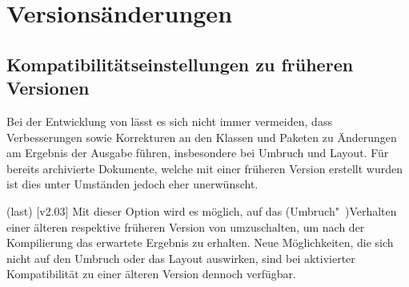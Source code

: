 \chapter{Versionsänderungen}
\begin{Entity}{}
\section{%
  Kompatibilitätseinstellungen zu früheren Versionen%
}
%
Bei der Entwicklung von \TUDScript lässt es sich nicht immer vermeiden, dass 
Verbesserungen sowie Korrekturen an den Klassen und Paketen zu Änderungen am 
Ergebnis der Ausgabe führen, insbesondere bei Umbruch und Layout. Für bereits
archivierte Dokumente, welche mit einer früheren Version erstellt wurden ist 
dies unter Umständen jedoch eher unerwünscht.

\begin{Declaration}
  {}
  (last)
  [v2.03]
\printdeclarationlist
Mit dieser Option wird es möglich, auf das (Umbruch"~)Verhalten einer älteren 
respektive früheren Version von \TUDScript umzuschalten, um nach der 
Kompilierung das erwartete Ergebnis zu erhalten. Neue Möglichkeiten, die sich 
nicht auf den Umbruch oder das Layout auswirken, sind bei aktivierter 
Kompatibilität zu einer älteren Version dennoch verfügbar. 


\end{Declaration}
\end{Entity}
